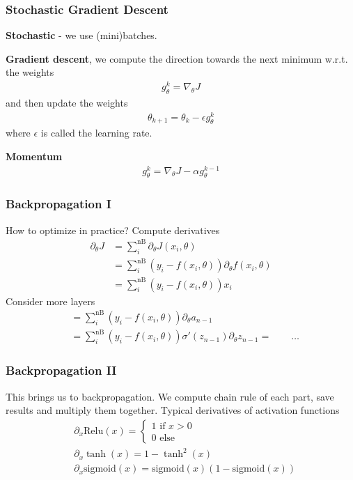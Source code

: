 \documentclass{beamer}
\begin{document}
\begin{frame}
\frametitle{Stochastic Gradient Descent}
\textbf{Stochastic} - we use (mini)batches.

\textbf{Gradient descent}, we compute the direction towards the next minimum w.r.t. the weights
\begin{align}
	g^k_\theta = \nabla_\theta J
\end{align}
and then update the weights
\begin{align}
	\theta_{k+1} = \theta_k - \epsilon g^k_\theta
\end{align}
where $\epsilon$ is called the learning rate. 
\pause

\textbf{Momentum}
\begin{align}
g^k_\theta =  \nabla_\theta J - \alpha g^{k-1}_\theta
\end{align}
\end{frame}

\begin{frame}
\frametitle{Backpropagation I}
How to optimize in practice? Compute derivatives
\begin{align}
	\partial_\theta J &= \sum_i^{\text{nB}} \partial_\theta J(x_i, \theta) \nonumber \\
	& = \sum_i^{\text{nB}} (y_i - f(x_i, \theta)) \partial_\theta f(x_i, \theta) \nonumber  \\
	& = \sum_i^{\text{nB}} (y_i - f(x_i, \theta)) x_i 
\end{align}
\pause
Consider more layers
\begin{align}
	& = \sum_i^{\text{nB}} (y_i - f(x_i, \theta)) \partial_\theta a_{n-1} \nonumber \\
	& = \sum_i^{\text{nB}} (y_i - f(x_i, \theta)) \sigma'(z_{n-1}) \partial_\theta z_{n-1} = \qquad  \hdots 
\end{align}

\end{frame}

\begin{frame}
\frametitle{Backpropagation II}
This brings us to backpropagation. We compute chain rule of each part, save results and multiply them together. Typical derivatives of activation functions
\begin{align}
	&\partial_x \text{Relu}(x) = \begin{cases}
	1 \text{ if } x>0\\
	0 \text{ else}
	\end{cases} \\
	&\partial_x \tanh(x) = 1 - \tanh^2(x) \\
	&\partial_x \text{sigmoid}(x) = \text{sigmoid}(x) (1 - \text{sigmoid}(x))
\end{align}

\end{frame}
\end{document}
